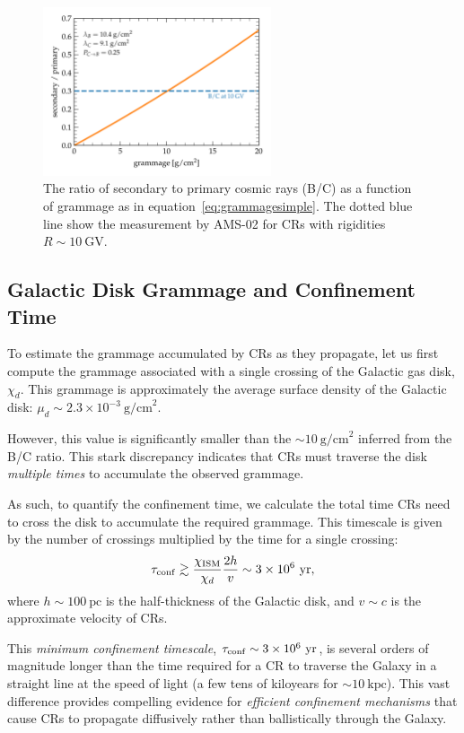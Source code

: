 \begin{figure}[t]
\centering
\includegraphics[width=0.6\textwidth]{figures/grammage_simple.pdf} 
\caption{The ratio of secondary to primary cosmic rays (B/C) as a function of grammage as in equation~\eqref{eq:grammagesimple}. The dotted blue line show the measurement by AMS-02 for CRs with rigidities \(R \sim 10~\text{GV}\).}
\label{fig:grammage10}
\end{figure}

\subsection{Galactic Disk Grammage and Confinement Time}

To estimate the grammage accumulated by CRs as they propagate, let us first compute the grammage associated with a single crossing of the Galactic gas disk, \(\chi_d\). This grammage is approximately the average surface density of the Galactic disk: \(\mu_d \sim 2.3 \times 10^{-3}~\text{g/cm}^2\).  

However, this value is significantly smaller than the \(\sim 10~\text{g/cm}^2\) inferred from the B/C ratio. This stark discrepancy indicates that CRs must traverse the disk \emph{multiple times} to accumulate the observed grammage.  

As such, to quantify the confinement time, we calculate the total time CRs need to cross the disk to accumulate the required grammage. This timescale is given by the number of crossings multiplied by the time for a single crossing:  
\[
\tau_{\rm conf} \gtrsim \frac{\chi_{\rm ISM}}{\chi_d} \frac{2h}{v} \sim 3 \times 10^6~\text{yr},
\]
where \(h \sim 100~\text{pc}\) is the half-thickness of the Galactic disk, and \(v \sim c\) is the approximate velocity of CRs.  

This \emph{minimum confinement timescale}, \(\tau_{\rm conf} \sim 3 \times 10^6~\text{yr}\), is several orders of magnitude longer than the time required for a CR to traverse the Galaxy in a straight line at the speed of light (a few tens of kiloyears for \(\sim 10~\text{kpc}\)). This vast difference provides compelling evidence for \emph{efficient confinement mechanisms} that cause CRs to propagate diffusively rather than ballistically through the Galaxy.  

